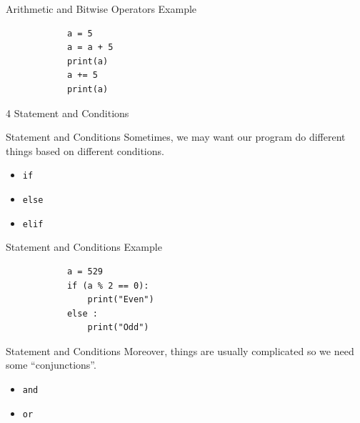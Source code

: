 \documentclass{beamer}
\begin{document}
    \begin{frame}[fragile]{Arithmetic and Bitwise Operators}
        \color{blue} \Large Example \\
        \color{black} \normalsize \vskip 10pt
        \begin{verbatim}
            a = 5
            a = a + 5
            print(a)
            a += 5
            print(a)
        \end{verbatim}
    \end{frame}

    \begin{frame}[plain, c]
        \begin{center}
            \color{blue} \LARGE 4 Statement and Conditions
        \end{center}
    \end{frame}
    
    \begin{frame}{Statement and Conditions}
        Sometimes, we may want our program do different things based on different conditions. \\
        \begin{itemize}
            \item \texttt{if}
            \item \texttt{else}
            \item \texttt{elif}
        \end{itemize}
    \end{frame}

    \begin{frame}[fragile]{Statement and Conditions}
        \color{blue} \Large Example \\
        \color{black} \normalsize \vskip 10pt
        \begin{verbatim}
            a = 529
            if (a % 2 == 0):
                print("Even")
            else :
                print("Odd")
        \end{verbatim}
    \end{frame}

    \begin{frame}{Statement and Conditions}
        Moreover, things are usually complicated so we need some ``conjunctions''.
        \begin{itemize}
            \item \texttt{and}
            \item \texttt{or}
        \end{itemize}
    \end{frame}
\end{document}

